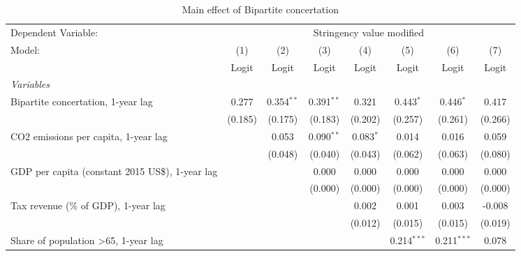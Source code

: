 
\begin{table}[htbp]
   \caption{Main effect of Bipartite concertation}
   \centering
   \begin{tabular}{lccccccc}
      \toprule
      Dependent Variable: & \multicolumn{7}{c}{Stringency value modified}\\
      Model:                                                & (1)     & (2)          & (3)          & (4)         & (5)           & (6)           & (7)\\  
                                                            &  Logit  & Logit        & Logit        & Logit       & Logit         & Logit         & Logit\\  
      \midrule
      \emph{Variables}\\
      Bipartite concertation, 1-year lag                    & 0.277   & 0.354$^{**}$ & 0.391$^{**}$ & 0.321       & 0.443$^{*}$   & 0.446$^{*}$   & 0.417\\   
                                                            & (0.185) & (0.175)      & (0.183)      & (0.202)     & (0.257)       & (0.261)       & (0.266)\\   
      CO2 emissions per capita, 1-year lag                  &         & 0.053        & 0.090$^{**}$ & 0.083$^{*}$ & 0.014         & 0.016         & 0.059\\   
                                                            &         & (0.048)      & (0.040)      & (0.043)     & (0.062)       & (0.063)       & (0.080)\\   
      GDP per capita (constant 2015 US\$), 1-year lag       &         &              & 0.000        & 0.000       & 0.000         & 0.000         & 0.000\\   
                                                            &         &              & (0.000)      & (0.000)     & (0.000)       & (0.000)       & (0.000)\\   
      Tax revenue (\% of GDP), 1-year lag                   &         &              &              & 0.002       & 0.001         & 0.003         & -0.008\\   
                                                            &         &              &              & (0.012)     & (0.015)       & (0.015)       & (0.019)\\   
      Share of population >65, 1-year lag                   &         &              &              &             & 0.214$^{***}$ & 0.211$^{***}$ & 0.078\\   

\end{tabular}
\end{table}
